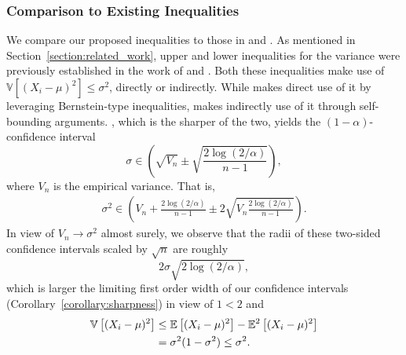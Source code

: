 \subsubsection*{Comparison to Existing Inequalities} \label{section:comparison}

We compare our proposed inequalities to those in \citet{audibert2009exploration} and \citet{maurer2009empirical}. As mentioned in Section~\ref{section:related_work}, upper and lower inequalities for the variance were previously established in the work of \citet[Theorem 1]{audibert2009exploration} and \citet[Theorem 10]{maurer2009empirical}. Both these inequalities make use of $\mathbb{V} [ (X_i-\mu)^2 ] \leq \sigma^2$, directly or indirectly. While \citet[Theorem 1]{audibert2009exploration} makes direct use of it by leveraging Bernstein-type inequalities, \citet[Theorem 10]{maurer2009empirical} makes indirectly use of it through self-bounding arguments. \citet[Theorem 10]{maurer2009empirical}, which is the sharper of the two, yields the  $(1-\alpha)$-confidence interval
$$\sigma \in \left(\sqrt{V_n} \pm \sqrt{\frac{2 \log (2 / \alpha)}{n-1}} \right),$$
where $V_n$ is the empirical variance. That is,
\begin{align*}
    \sigma^2 \in \left(V_n +\frac{2 \log (2 / \alpha)}{n-1} \pm 2\sqrt{V_n\frac{2 \log (2 / \alpha)}{n-1}} \right).
\end{align*}
In view of $V_n \to \sigma^2$ almost surely, we observe that the radii of these two-sided confidence intervals scaled by $\sqrt n$ are roughly $$2\sigma\sqrt{2 \log (2 / \alpha)},$$
which is larger the limiting first order width of our confidence intervals (Corollary~\ref{corollary:sharpness}) in view of $1 < 2$ and
\begin{align*}
    \mathbb{V} \left[ (X_i-\mu)^2\right] &\leq \mathbb{E}\left[ (X_i-\mu)^2\right] - \mathbb{E}^2\left[ (X_i-\mu)^2\right]
    \\&= \sigma^2(1 - \sigma^2) \leq \sigma^2.
\end{align*}
 




